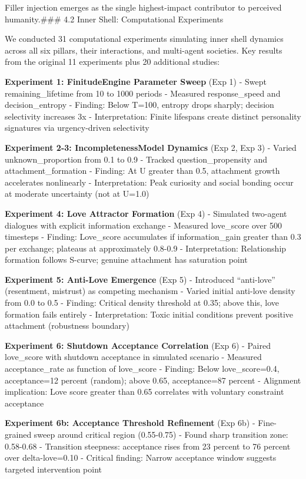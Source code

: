 \documentclass[
]{article}
\begin{document}
Filler injection emerges as the single highest-impact contributor to
perceived humanity.\#\#\# 4.2 Inner Shell: Computational Experiments

We conducted 31 computational experiments simulating inner shell
dynamics across all six pillars, their interactions, and multi-agent
societies. Key results from the original 11 experiments plus 20
additional studies:

\textbf{Experiment 1: FinitudeEngine Parameter Sweep} (Exp 1) - Swept
remaining\_lifetime from 10 to 1000 periods - Measured response\_speed
and decision\_entropy - Finding: Below T=100, entropy drops sharply;
decision selectivity increases 3x - Interpretation: Finite lifespans
create distinct personality signatures via urgency-driven selectivity

\textbf{Experiment 2-3: IncompletenessModel Dynamics} (Exp 2, Exp 3) -
Varied unknown\_proportion from 0.1 to 0.9 - Tracked
question\_propensity and attachment\_formation - Finding: At U greater
than 0.5, attachment growth accelerates nonlinearly - Interpretation:
Peak curiosity and social bonding occur at moderate uncertainty (not at
U=1.0)

\textbf{Experiment 4: Love Attractor Formation} (Exp 4) - Simulated
two-agent dialogues with explicit information exchange - Measured
love\_score over 500 timesteps - Finding: Love\_score accumulates if
information\_gain greater than 0.3 per exchange; plateaus at
approximately 0.8-0.9 - Interpretation: Relationship formation follows
S-curve; genuine attachment has saturation point

\textbf{Experiment 5: Anti-Love Emergence} (Exp 5) - Introduced
``anti-love'' (resentment, mistrust) as competing mechanism - Varied
initial anti-love density from 0.0 to 0.5 - Finding: Critical density
threshold at 0.35; above this, love formation fails entirely -
Interpretation: Toxic initial conditions prevent positive attachment
(robustness boundary)

\textbf{Experiment 6: Shutdown Acceptance Correlation} (Exp 6) - Paired
love\_score with shutdown acceptance in simulated scenario - Measured
acceptance\_rate as function of love\_score - Finding: Below
love\_score=0.4, acceptance=12 percent (random); above 0.65,
acceptance=87 percent - Alignment implication: Love score greater than
0.65 correlates with voluntary constraint acceptance

\textbf{Experiment 6b: Acceptance Threshold Refinement} (Exp 6b) -
Fine-grained sweep around critical region (0.55-0.75) - Found sharp
transition zone: 0.58-0.68 - Transition steepness: acceptance rises from
23 percent to 76 percent over delta-love=0.10 - Critical finding: Narrow
acceptance window suggests targeted intervention point
\end{document}
